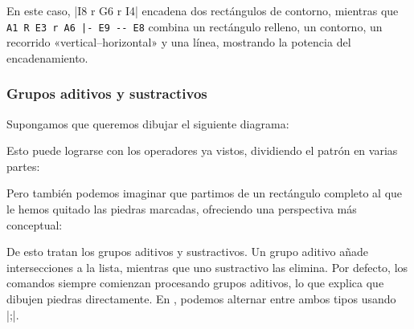 \begin{goban}[9, stone = {radius = 4pt}, mark = {line = {color = red}}]
En este caso, |I8 r G6 r I4| encadena dos rectángulos de contorno, mientras que \verb+A1 R E3 r A6 |- E9 -- E8+ combina un rectángulo relleno, un contorno, un recorrido «vertical--horizontal» y una línea, mostrando la potencia del encadenamiento.

\subsubsection{Grupos aditivos y sustractivos}

Supongamos que queremos dibujar el siguiente diagrama:

\begin{figure}[H]
	\centering
	\begin{goban}
	\end{goban}
\end{figure}

Esto puede lograrse con los operadores ya vistos, dividiendo el patrón en varias partes:

\begin{codeexample}[width=6cm]
	\begin{goban}[label = {at = all}]
		\stones[fill = {color = orange}] {A6 R B3, B2 R E1, D4 R E6}
	\end{goban}
\end{codeexample}

Pero también podemos imaginar que partimos de un rectángulo completo al que le hemos quitado las piedras marcadas, ofreciendo una perspectiva más conceptual:

\begin{figure}[H]
	\centering
	\begin{goban}
		\stones[b]{A1 R E6}
		\marks[cross, line = {color = white}]{C6 |- E3, A1:2}
	\end{goban}
\end{figure}

De esto tratan los grupos aditivos y sustractivos. Un grupo aditivo añade intersecciones a la lista, mientras que uno sustractivo las elimina. Por defecto, los comandos siempre comienzan procesando grupos aditivos, lo que explica que dibujen piedras directamente. En \pgfgoname, podemos alternar entre ambos tipos usando |;|.

\begin{codeexample}[width=6cm]
	\begin{goban}[label = {at = all}, partial = A1:E6]
	\end{goban}
	

\end{codeexample}
\end{goban}
